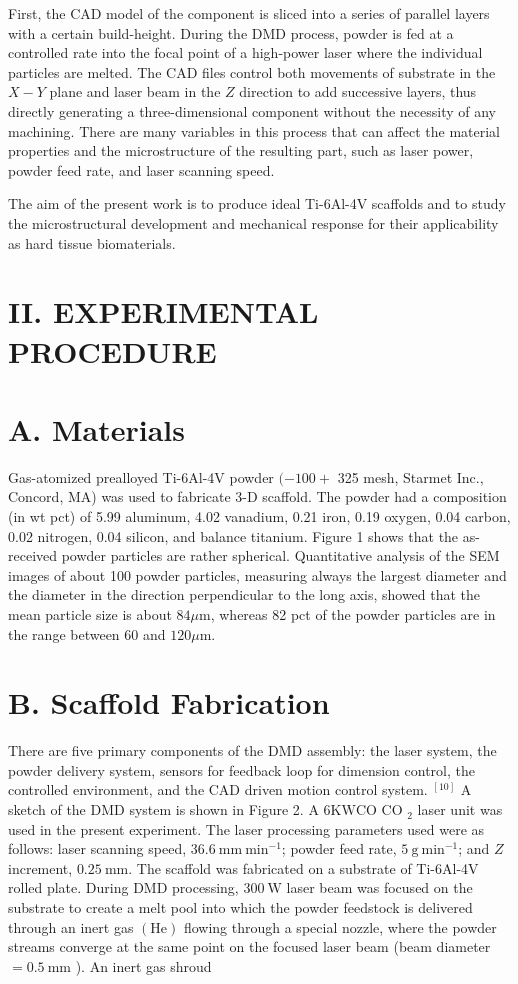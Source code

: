 \documentclass[10pt]{article}
\begin{document}
First, the CAD model of the component is sliced into a series of parallel layers with a certain build-height. During the DMD process, powder is fed at a controlled rate into the focal point of a high-power laser where the individual particles are melted. The CAD files control both movements of substrate in the $X-Y$ plane and laser beam in the $Z$ direction to add successive layers, thus directly generating a three-dimensional component without the necessity of any machining. There are many variables in this process that can affect the material properties and the microstructure of the resulting part, such as laser power, powder feed rate, and laser scanning speed.

The aim of the present work is to produce ideal Ti-6Al-4V scaffolds and to study the microstructural development and mechanical response for their applicability as hard tissue biomaterials.

\section*{II. EXPERIMENTAL PROCEDURE}
\section*{A. Materials}
Gas-atomized prealloyed Ti-6Al-4V powder $(-100+$ 325 mesh, Starmet Inc., Concord, MA) was used to fabricate 3-D scaffold. The powder had a composition (in wt pct) of 5.99 aluminum, 4.02 vanadium, 0.21 iron, 0.19 oxygen, 0.04 carbon, 0.02 nitrogen, 0.04 silicon, and balance titanium. Figure 1 shows that the as-received powder particles are rather spherical. Quantitative analysis of the SEM images of about 100 powder particles, measuring always the largest diameter and the diameter in the direction perpendicular to the long axis, showed that the mean particle size is about $84 \mu \mathrm{m}$, whereas 82 pct of the powder particles are in the range between 60 and $120 \mu \mathrm{m}$.

\section*{B. Scaffold Fabrication}
There are five primary components of the DMD assembly: the laser system, the powder delivery system, sensors for feedback loop for dimension control, the controlled environment, and the CAD driven motion control system. ${ }^{[10]}$ A sketch of the DMD system is shown in Figure 2. A $6 \mathrm{KW} \mathrm{CO}$ CO $_{2}$ laser unit was used in the present experiment. The laser processing parameters used were as follows: laser scanning speed, $36.6 \mathrm{~mm} \mathrm{~min}^{-1}$; powder feed rate, $5 \mathrm{~g} \mathrm{~min}^{-1}$; and $Z$ increment, $0.25 \mathrm{~mm}$. The scaffold was fabricated on a substrate of Ti-6Al-4V rolled plate. During DMD processing, $300 \mathrm{~W}$ laser beam was focused on the substrate to create a melt pool into which the powder feedstock is delivered through an inert gas $(\mathrm{He})$ flowing through a special nozzle, where the powder streams converge at the same point on the focused laser beam (beam diameter $=0.5 \mathrm{~mm}$ ). An inert gas shroud
\end{document}
